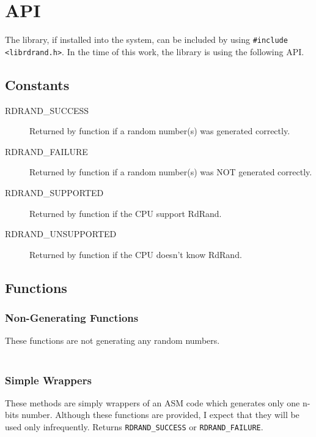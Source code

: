 \section{API} \label{sec:library-api}
The library, if installed into the system, can be included by using {\tt \#include <librdrand.h>}. In the time of this work, the library is using the following API.

\subsection{Constants}
\begin{description}
  \item[RDRAND\_SUCCESS] Returned by function if a random number(s) was generated correctly.
  \item[RDRAND\_FAILURE] Returned by function if a random number(s) was NOT generated correctly.
  \item[RDRAND\_SUPPORTED] Returned by  function if the CPU support RdRand.
  \item[RDRAND\_UNSUPPORTED] Returned by  function if the CPU doesn't know RdRand.
  
\end{description}


\subsection{Functions}

\subsubsection{Non-Generating Functions}

These functions are not generating any random numbers.\\

\\

\subsubsection{Simple Wrappers}\label{subsec:api:simple-wrappers}
These methods are simply wrappers of an ASM code which generates only one n-bits number. Although these functions are provided, I expect that they will be used only infrequently. Returns {\tt RDRAND\_SUCCESS} or {\tt RDRAND\_FAILURE}.\\

